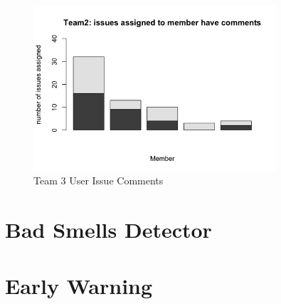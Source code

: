 \documentclass[conference]{IEEEtran}
\begin{document}
\begin{figure}[H]
    \centering
    \includegraphics[width=9cm]{../AprilProject/pic/team3_user_issue_comments.png}
    \caption{Team 3 User Issue Comments}
    \label{team3_issue_comment}
\end{figure}
\section{Bad Smells Detector}
\section{Early Warning}
\end{document}

